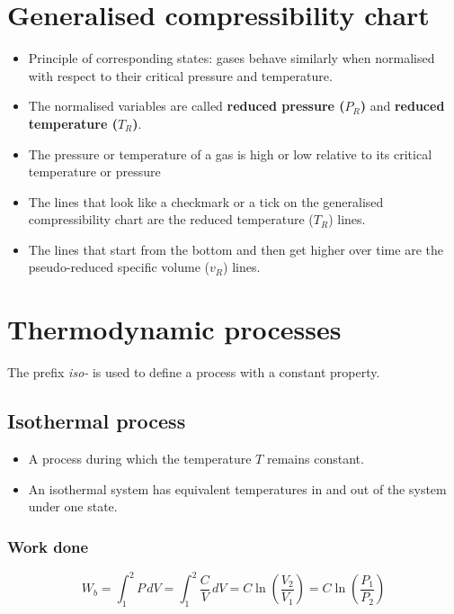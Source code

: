 \documentclass[11pt]{article}
\begin{document}
\section{Generalised compressibility chart}
\label{sec:orge69aec3}
\begin{itemize}
\item Principle of corresponding states: gases behave similarly when normalised with respect to their critical pressure and temperature.
\item The normalised variables are called \textbf{reduced pressure (\(P_R\))} and \textbf{reduced temperature (\(T_R\))}.
\item The pressure or temperature of a gas is high or low relative to its critical temperature or pressure
\item The lines that look like a checkmark or a tick on the generalised compressibility chart are the reduced temperature (\(T_R\)) lines.
\item The lines that start from the bottom and then get higher over time are the pseudo-reduced specific volume (\(v_R\)) lines.
\end{itemize}

\newpage

\section{Thermodynamic processes}
\label{sec:org5c30f30}
The prefix \emph{iso-} is used to define a process with a constant property.

\subsection{Isothermal process}
\label{sec:org8be431b}
\begin{itemize}
\item A process during which the temperature \(T\) remains constant.
\item An isothermal system has equivalent temperatures in and out of the system under one state.
\end{itemize}

\subsubsection{Work done}
\label{sec:org83287ce}
\[W_b = \int_1^2 P \, dV = \int_1^2 \frac{C}{V} \, dV = C \ln \left(\frac{V_2}{V_1} \right) = C \ln \left(\frac{P_1}{P_2} \right)\]
\end{document}
